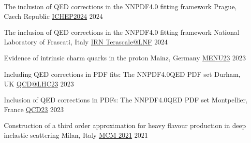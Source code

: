 \begin{cvhonors}

    \cvhonor
    {The inclusion of QED corrections in the NNPDF4.0 fitting framework} %
    {Prague, Czech Republic}
    {\href{https://indico.cern.ch/event/1291157/contributions/5876646/}{ICHEP2024}} %
    {2024}

    \cvhonor
    {The inclusion of QED corrections in the NNPDF4.0 fitting framework} %
    {National Laboratory of Frascati, Italy}
    {\vspace{0.35cm}\href{https://indico.in2p3.fr/event/31806/contributions/136024/}{IRN Terascale@LNF}} %
    {\vspace{0.35cm}2024}

    \cvhonor
    {Evidence of intrinsic charm quarks in the proton} %
    {Mainz, Germany}
    {\href{https://indico.him.uni-mainz.de/event/171/contributions/1438/}{MENU23}} %
    {2023}

    \cvhonor
    {Including QED corrections in PDF fits: The NNPDF4.0QED PDF set} %
    {Durham, UK}
    {\href{https://conference.ippp.dur.ac.uk/event/1128/contributions/6473/}{QCD@LHC23}} %
    {2023}

    \cvhonor
    {Inclusion of QED corrections in PDFs: The NNPDF4.0QED PDF set} %
    {Montpellier, France}
    {\href{https://qcd23.sciencesconf.org/}{QCD23}} %
    {2023}

    \cvhonor
    {Construction of a third order approximation for heavy flavour production in deep inelastic scattering} %
    {Milan, Italy}
    {\vspace{0.35cm}\href{https://indico.cern.ch/event/1095418/contributions/4656984/}{MCM 2021}} %
    {\vspace{0.35cm}2021}
    
    


\end{cvhonors}